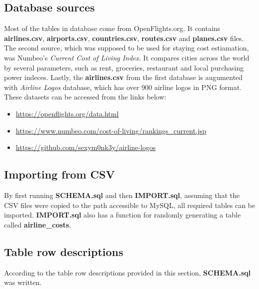 \documentclass[12pt]{article}
\begin{document}
\subsection{Database sources}
\label{sec:org7d612d1}
Most of the tables in database come from OpenFlights.org. It contains \textbf{airlines.csv}, \textbf{airports.csv}, \textbf{countries.csv}, \textbf{routes.csv} and \textbf{planes.csv} files. The second source, which was supposed to be used for staying cost estiamation, was Numbeo's \emph{Current Cost of Living Index}. It compares cities across the world by several parameters, such as rent, groceries, restaurant and local purchasing power indeces. Lastly, the \textbf{airlines.csv} from the first database is augumented with \emph{Airline Logos} database, which has over 900 airline logos in PNG format. These datasets can be accessed from the links below:
\begin{itemize}
\item \url{https://openflights.org/data.html}
\item \url{https://www.numbeo.com/cost-of-living/rankings\_current.jsp}
\item \url{https://github.com/sexym0nk3y/airline-logos}
\end{itemize}
\subsection{Importing from CSV}
\label{sec:org90f1637}
By first running \textbf{SCHEMA.sql} and then \textbf{IMPORT.sql}, assuming that the CSV files were copied to the path accessible to MySQL, all required tables can be imported. \textbf{IMPORT.sql} also has a function for randomly generating a table called \textbf{airline\_costs}.

\subsection{Table row descriptions}
\label{sec:org213fb29}
According to the table row descriptions provided in this section, \textbf{SCHEMA.sql} was written.
\end{document}
